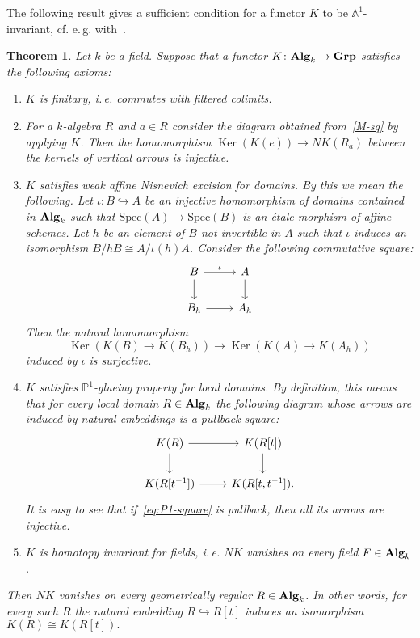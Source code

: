 \documentclass[oneside, 11pt]{amsart} \pdfoutput=1
\newcommand{\Ker}{\mathop{\mathrm{Ker}}\nolimits}
\numberwithin{equation}{section}
\newtheorem{theorem}[lemma]{Theorem}
\theoremstyle{definition}
\newcommand{\catname}[1]{{\normalfont\textbf{#1}}} %
\begin{document}
The following result gives a sufficient condition for a functor $K$ to be $\mathbb{A}^1$-invariant, cf. e.\,g. with~\cite[Proposition~2.2]{AHW20}.
\begin{theorem} \label{lpb}
 Let $k$ be a field.
 Suppose that a functor $K \colon \catname{Alg}_k \to \catname{Grp}$ satisfies the following axioms:
 \begin{enumerate}[label=\textnormal{(A\arabic*)}]
  \item \label{CFC} {\it $K$ is finitary}, i.\,e. commutes with filtered colimits.
  \item \label{DP} %
  For a $k$-algebra $R$ and $a \in R$ consider the diagram obtained from~\eqref{M-sq} by applying $K$. Then the homomorphism $\Ker(K(e)) \to NK(R_a)$ between the kernels of vertical arrows is injective.
  \item \label{LPP} {\it $K$ satisfies weak affine Nisnevich excision for domains.} By this we mean the following. Let $\iota \colon B \hookrightarrow A$ be an injective homomorphism of domains contained in $\catname{Alg}_k$ such that $\mathrm{Spec}(A)\to\mathrm{Spec}(B)$ is an {\'e}tale morphism of affine schemes. Let $h$ be an element of $B$ not invertible in $A$ such that $\iota$ induces an isomorphism $B / hB \cong A / \iota(h)A$. Consider the following commutative square: \[\begin{tikzcd} B \ar{r}{\iota} \ar{d} & A \ar{d}\\ B_h \ar{r} & A_h \end{tikzcd}\] Then the natural homomorphism \[\Ker(K(B) \to K(B_h)) \to \Ker(K(A) \to K(A_h))\] induced by $\iota$ is surjective.
  \item \label{PGP} {\it $K$ satisfies $\mathbb{P}^1$-glueing property for local domains.} By definition, this means that for every local domain $R \in \catname{Alg}_k$ the following diagram whose arrows are induced by natural embeddings is a pullback square: \begin{equation}\label{eq:P1-square} \begin{tikzcd} K(R) \ar[r] \ar[d] & K(R[t]) \arrow{d} \\ K(R[t^{-1}]) \ar{r} & K(R[t, t^{-1}]). \end{tikzcd} \end{equation}  
  It is easy to see that if~\eqref{eq:P1-square} is pullback, then all its arrows are injective.
  \item \label{HIF} {\it $K$ is homotopy invariant for fields}, i.\,e. $NK$ vanishes on every field $F \in \catname{Alg}_k$.
 \end{enumerate}
 Then $NK$ vanishes on every geometrically regular $R\in \catname{Alg}_k$. In other words, for every such $R$ the natural embedding $R \hookrightarrow R[t]$ induces an isomorphism $K(R)\cong K(R[t]).$
\end{theorem}
\end{document}
